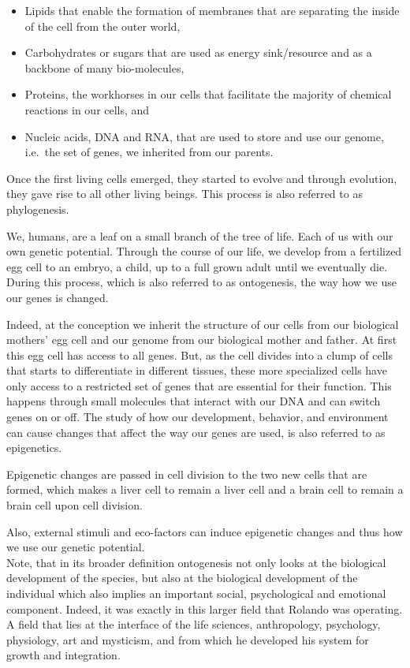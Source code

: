 \documentclass[
  11pt,
]{book}
\providecommand{\tightlist}{%
  \setlength{\itemsep}{0pt}\setlength{\parskip}{0pt}}
\begin{document}
\begin{itemize}
\tightlist
\item
  Lipids that enable the formation of membranes that are separating the inside of the cell from the outer world,
\item
  Carbohydrates or sugars that are used as energy sink/resource and as a backbone of many bio-molecules,
\item
  Proteins, the workhorses in our cells that facilitate the majority of chemical reactions in our cells, and
\item
  Nucleic acids, DNA and RNA, that are used to store and use our genome, i.e.~the set of genes, we inherited from our parents.
\end{itemize}

Once the first living cells emerged, they started to evolve and through evolution, they gave rise to all other living beings. This process is also referred to as phylogenesis.

We, humans, are a leaf on a small branch of the tree of life. Each of us with our own genetic potential. Through the course of our life, we develop from a fertilized egg cell to an embryo, a child, up to a full grown adult until we eventually die. During this process, which is also referred to as ontogenesis, the way how we use our genes is changed.

Indeed, at the conception we inherit the structure of our cells from our biological mothers' egg cell and our genome from our biological mother and father. At first this egg cell has access to all genes. But, as the cell divides into a clump of cells that starts to differentiate in different tissues, these more specialized cells have only access to a restricted set of genes that are essential for their function. This happens through small molecules that interact with our DNA and can switch genes on or off.
The study of how our development, behavior, and environment can cause changes that affect the way our genes are used, is also referred to as epigenetics.

Epigenetic changes are passed in cell division to the two new cells that are formed, which makes a liver cell to remain a liver cell and a brain cell to remain a brain cell upon cell division.

Also, external stimuli and eco-factors can induce epigenetic changes and thus how we use our genetic potential.\\

Note, that in its broader definition ontogenesis not only looks at the biological development of the species, but also at the biological development of the individual which also implies an important social, psychological and emotional component.
Indeed, it was exactly in this larger field that Rolando was operating. A field that lies at the interface of the life sciences, anthropology, psychology, physiology, art and mysticism, and from which he developed his system for growth and integration.
\end{document}
